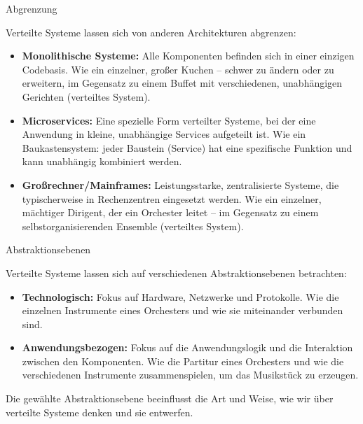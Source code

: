 \documentclass{beamer}
\begin{document}
\begin{frame}{Abgrenzung}

    Verteilte Systeme lassen sich von anderen Architekturen abgrenzen:

    \begin{itemize}
        \item \textbf{Monolithische Systeme:}  Alle Komponenten befinden sich in einer einzigen Codebasis.  Wie ein einzelner, großer Kuchen – schwer zu ändern oder zu erweitern, im Gegensatz zu einem Buffet mit verschiedenen, unabhängigen Gerichten (verteiltes System).
        \item \textbf{Microservices:} Eine spezielle Form verteilter Systeme, bei der eine Anwendung in kleine, unabhängige Services aufgeteilt ist. Wie ein Baukastensystem: jeder Baustein (Service) hat eine spezifische Funktion und kann unabhängig kombiniert werden.
        \item \textbf{Großrechner/Mainframes:} Leistungsstarke, zentralisierte Systeme, die typischerweise in Rechenzentren eingesetzt werden. Wie ein einzelner, mächtiger Dirigent, der ein Orchester leitet – im Gegensatz zu einem selbstorganisierenden Ensemble (verteiltes System).
    \end{itemize}

\end{frame}

\begin{frame}{Abstraktionsebenen}

    Verteilte Systeme lassen sich auf verschiedenen Abstraktionsebenen betrachten:

    \begin{itemize}
        \item \textbf{Technologisch:} Fokus auf Hardware, Netzwerke und Protokolle.  Wie die einzelnen Instrumente eines Orchesters und wie sie miteinander verbunden sind.
        \item \textbf{Anwendungsbezogen:} Fokus auf die Anwendungslogik und die Interaktion zwischen den Komponenten.  Wie die Partitur eines Orchesters und wie die verschiedenen Instrumente zusammenspielen, um das Musikstück zu erzeugen.
    \end{itemize}

    Die gewählte Abstraktionsebene beeinflusst die Art und Weise, wie wir über verteilte Systeme denken und sie entwerfen.

\end{frame}
\end{document}
